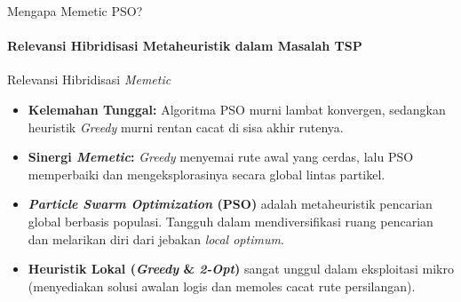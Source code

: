 \documentclass[aspectratio=169,10pt]{beamer}
\begin{document}
\begin{frame}{Mengapa Memetic PSO?}
  \framesubtitle{Relevansi Hibridisasi Metaheuristik dalam Masalah TSP}
  \begin{block}{Relevansi Hibridisasi \textit{Memetic}}
    \begin{itemize}
      \item \textbf{Kelemahan Tunggal:} Algoritma PSO murni lambat konvergen, sedangkan heuristik \textit{Greedy} murni rentan cacat di sisa akhir rutenya.
      \item \textbf{Sinergi \textit{Memetic}:} \textit{Greedy} menyemai rute awal yang cerdas, lalu PSO memperbaiki dan mengeksplorasinya secara global lintas partikel.
    \end{itemize}
  \end{block}
  
  \vspace{0.3cm}
  \begin{itemize}
    \item \textbf{\textit{Particle Swarm Optimization} (PSO)} adalah metaheuristik pencarian global berbasis populasi. Tangguh dalam mendiversifikasi ruang pencarian dan melarikan diri dari jebakan \textit{local optimum}.
    \item \textbf{Heuristik Lokal (\textit{Greedy} \& \textit{2-Opt})} sangat unggul dalam eksploitasi mikro (menyediakan solusi awalan logis dan memoles cacat rute persilangan).
  \end{itemize}
\end{frame}
\end{document}
